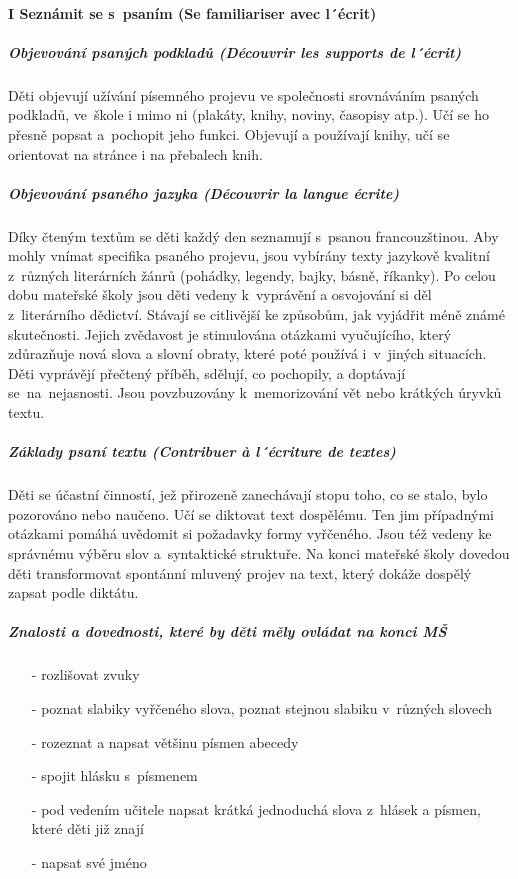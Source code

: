 			\paragraph*{I Seznámit se s psaním (Se familiariser avec l´écrit)}
				\subparagraph{Objevování psaných podkladů (Découvrir les supports de l´écrit)}
					Děti objevují užívání písemného projevu ve společnosti srovnáváním psaných podkladů, ve škole i mimo ni (plakáty, knihy, noviny, časopisy atp.). Učí se ho přesně popsat a pochopit jeho funkci. Objevují a používají knihy, učí se orientovat na stránce i na přebalech knih. 
				\subparagraph{Objevování psaného jazyka (Découvrir la langue écrite)}
					Díky čteným textům se děti každý den seznamují s psanou francouzštinou. Aby mohly vnímat specifika psaného projevu, jsou vybírány texty jazykově kvalitní z různých literárních žánrů (pohádky, legendy, bajky, básně, říkanky). Po celou dobu mateřské školy jsou děti vedeny k vyprávění a osvojování si děl z literárního dědictví. Stávají se citlivější ke způsobům, jak vyjádřit méně známé skutečnosti. Jejich zvědavost je stimulována otázkami vyučujícího, který zdůrazňuje nová slova a slovní obraty, které poté používá i v jiných situacích.  Děti vyprávějí přečtený příběh, sdělují, co pochopily, a doptávají se na nejasnosti. Jsou povzbuzovány k memorizování vět nebo krátkých úryvků textu. 
				\subparagraph{Základy psaní textu (Contribuer à l´écriture de textes)}
					Děti se účastní činností, jež přirozeně zanechávají stopu toho, co se stalo, bylo pozorováno nebo naučeno. Učí se diktovat text dospělému. Ten jim případnými otázkami pomáhá uvědomit si požadavky formy vyřčeného. Jsou též vedeny ke správnému výběru slov a syntaktické struktuře. Na konci mateřské školy dovedou děti transformovat spontánní mluvený projev na text, který dokáže dospělý zapsat podle diktátu.

				\subparagraph{Znalosti a dovednosti, které by děti měly ovládat na konci MŠ} 
				\begin{itemize}
					\setlength\itemsep{-2mm}
					\item[-] rozlišovat zvuky
					\item[-] poznat slabiky vyřčeného slova, poznat stejnou slabiku v různých slovech
					\item[-] rozeznat a napsat většinu písmen abecedy
					\item[-] spojit hlásku s písmenem
					\item[-] pod vedením učitele napsat krátká jednoduchá slova z hlásek a písmen, které děti již znají 	
					\item[-] napsat své jméno
				\end{itemize}


